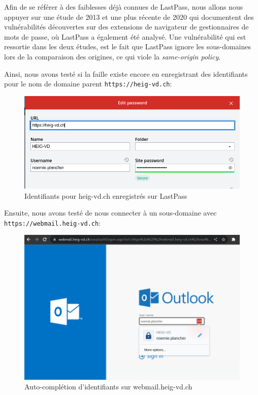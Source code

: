 Afin de se référer à des faiblesses déjà connues de LastPass, nous allons nous appuyer sur une étude de 2013\cite{youn} et une plus récente de 2020\cite{carr} qui documentent des vulnérabilités découvertes sur des extensions de navigateur de gestionnaires de mots de passe, où LastPass a également été analysé. Une vulnérabilité qui est ressortie dans les deux études, est le fait que LastPass ignore les sous-domaines lors de la comparaison des origines, ce qui viole la \textit{same-origin policy}. 

Ainsi, nous avons testé si la faille existe encore en enregistrant des identifiants pour le nom de domaine parent \verb|https://heig-vd.ch|:

\begin{figure}[H]
	\centering
	\includegraphics[width=15.5cm]{images/lp_heigvd.png}
	\caption{Identifiants pour heig-vd.ch enregistrés sur LastPass}
\end{figure}

\newpage

Ensuite, nous avons testé de nous connecter à un sous-domaine avec \\ \verb|https://webmail.heig-vd.ch|:
\begin{figure}[H]
	\centering
	\includegraphics[width=15.5cm]{images/lp_webmail.png}
	\caption{Auto-complétion d'identifiants sur webmail.heig-vd.ch}
\end{figure}

